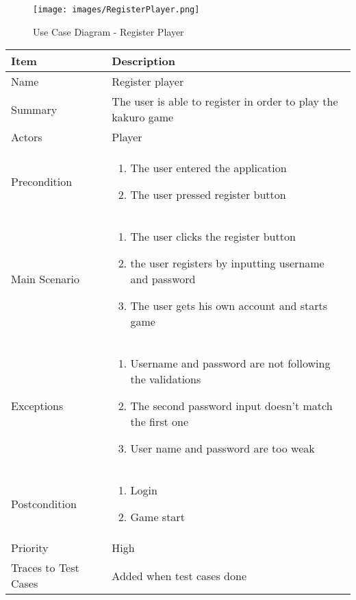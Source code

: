 \documentclass[12pt]{article}
\begin{document}
\begin{figure}[htbp]
    \centering
    \texttt{[image: images/RegisterPlayer.png]}
    \caption{Use Case Diagram - Register Player}
    \label{fig:RegisterPlayer}
\end{figure}

\begin{center}
\setlength{\tabcolsep}{18pt}
\renewcommand{\arraystretch}{1.3}
\begin{tabular}{ |p{3cm}|p{10cm}| }
    \hline
    \rowcolor{green}
   Item & Description \\
    \hline
    Name & Register player \\
    \hline
    Summary & The user is able to register in order to play the kakuro game \\
    \hline
    Actors & Player \\
    \hline
    Precondition & 
    \vspace*{-0.2in}
    \begin{enumerate}
        \item The user entered the application
        \item The user pressed register button
    \end{enumerate}  \\
    \hline
    Main Scenario &     
    \vspace*{-0.2in}
    \begin{enumerate}
        \item The user clicks the register button
        \item the user registers by inputting username and password
        \item The user gets his own account and starts game
    \end{enumerate}  \\
    \hline
    Exceptions & 
    \vspace*{-0.2in}
    \begin{enumerate}
        \item Username and password are not following the validations
        \item The second password input doesn't match the first one
        \item User name and password are too weak
    \end{enumerate}  \\
    \hline
    Postcondition &
    \vspace*{-0.2in}
    \begin{enumerate}
        \item Login
        \item Game start
    \end{enumerate}  \\
    \hline
    Priority & High \\
    \hline
    Traces to Test Cases & Added when test cases done  \\
    \hline
\end{tabular}
\end{center}
\end{document}
